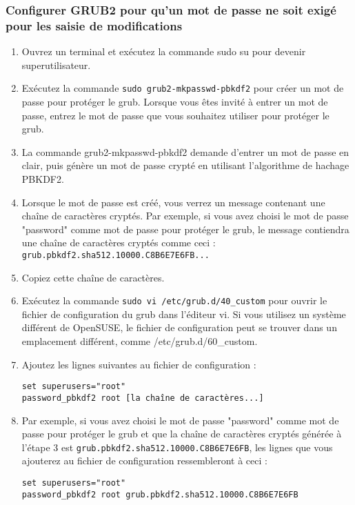 \documentclass[12pt,a4paper]{article}
\newcommand{\code}[1]{\colorbox{light-gray}{\texttt{#1}}}
\begin{document}
        \subsubsection{Configurer GRUB2 pour qu'un mot de passe ne soit exigé pour les saisie de modifications} 
        \begin{enumerate}
            \item Ouvrez un terminal et exécutez la commande sudo su pour devenir superutilisateur.
            \item Exécutez la commande \code{sudo grub2-mkpasswd-pbkdf2} pour créer un mot de passe pour protéger le grub. Lorsque vous êtes invité à entrer un mot de passe, entrez le mot de passe que vous souhaitez utiliser pour protéger le grub.
            \item La commande grub2-mkpasswd-pbkdf2 demande d'entrer un mot de passe en clair, puis génère un mot de passe crypté en utilisant l'algorithme de hachage PBKDF2.
            \item Lorsque le mot de passe est créé, vous verrez un message contenant une chaîne de caractères cryptés. Par exemple, si vous avez choisi le mot de passe "password" comme mot de passe pour protéger le grub, le message contiendra une chaîne de caractères cryptés comme ceci : \code{grub.pbkdf2.sha512.10000.C8B6E7E6FB...}
            \item Copiez cette chaîne de caractères.
            \item Exécutez la commande \code{sudo vi /etc/grub.d/40\_custom} pour ouvrir le fichier de configuration du grub dans l'éditeur vi. Si vous utilisez un système différent de OpenSUSE, le fichier de configuration peut se trouver dans un emplacement différent, comme /etc/grub.d/60\_custom.
            \item Ajoutez les lignes suivantes au fichier de configuration :
            \begin{lstlisting}
set superusers="root"
password_pbkdf2 root [la chaîne de caractères...]
            \end{lstlisting}
            \item Par exemple, si vous avez choisi le mot de passe "password" comme mot de passe pour protéger le grub et que la chaîne de caractères cryptés générée à l'étape 3 est \code{grub.pbkdf2.sha512.10000.C8B6E7E6FB}, les lignes que vous ajouterez au fichier de configuration ressembleront à ceci :
            \begin{lstlisting}
set superusers="root"
password_pbkdf2 root grub.pbkdf2.sha512.10000.C8B6E7E6FB

\end{lstlisting}
\end{enumerate}
\end{document}

